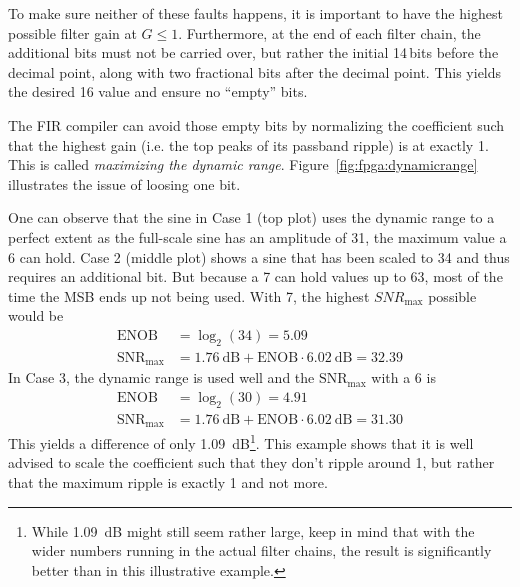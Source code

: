 To make  sure neither  of these faults  happens, it is  important to  have the
highest possible  filter gain at $G  \leq 1$. Furthermore, at the  end of each
filter chain,  the additional bits  must not be  carried over, but  rather the
initial \num{14}\,bits  before the  decimal point,  along with  two fractional
bits after the decimal point. This  yields the desired \SI{16}{\bit} value and
ensure no ``empty'' bits.

The FIR  compiler can avoid  those empty  bits by normalizing  the coefficient
such  that the  highest  gain (i.e.  the  top peaks  of  its passband  ripple)
is  at  exactly   \num{1}.   This  is  called   \emph{maximizing  the  dynamic
range}. Figure~\ref{fig:fpga:dynamicrange}  illustrates the  issue of  loosing
one bit.

One can  observe that  the sine in  Case \num{1} (top  plot) uses  the dynamic
range to a perfect extent as the full-scale sine has an amplitude of \num{31},
the maximum  value a \SI{6}{\bit}   can hold. Case  \num{2} (middle
plot) shows  a sine  that has  been scaled  to \num{34}  and thus  requires an
additional bit.  But  because a \SI{7}{\bit}  can hold  values up to
\num{63}, most of the time the MSB  ends up not being used. With \SI{7}{\bit},
the highest $SNR_\mathrm{max}$ possible would be
\begin{align}
    \mathrm{ENOB}             &= \log_2(34) = 5.09 \nonumber \\
    \mathrm{SNR}_\mathrm{max} &= \SI{1.76}{\dB} + \mathrm{ENOB} \cdot \SI{6.02}{\dB} = 32.39
\end{align}
In   Case    \num{3},   the   dynamic    range   is   used   well    and   the
$\mathrm{SNR}_\mathrm{max}$ with a \SI{6}{\bit}  is
\begin{align}
    \mathrm{ENOB}             &= \log_2(30)  = 4.91 \nonumber\\
    \mathrm{SNR}_\mathrm{max} &= \SI{1.76}{\dB} + \mathrm{ENOB} \cdot \SI{6.02}{\dB} = 31.30
\end{align}
This yields a difference of only \SI{1.09}{\dB}\footnote{%
    While \SI{1.09}{\dB} might still seem rather large, keep in mind that with
    the  wider numbers  running in  the actual  filter chains,  the result  is
    significantly better than in this illustrative example.%
}.
This example shows that it is well  advised to scale the coefficient such that
they  don't ripple  around  \num{1}, but  rather that  the  maximum ripple  is
exactly \num{1} and not more.

